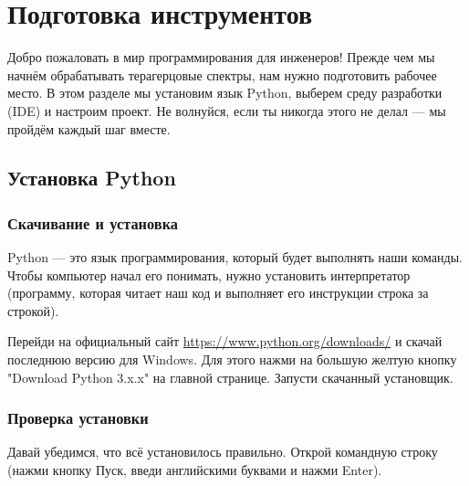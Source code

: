 
\section{Подготовка инструментов}\label{sec:preparation}

Добро пожаловать в мир программирования для инженеров! Прежде чем мы начнём обрабатывать терагерцовые спектры, нам нужно подготовить рабочее место. В этом разделе мы установим язык Python, выберем среду разработки (IDE) и настроим проект. Не волнуйся, если ты никогда этого не делал — мы пройдём каждый шаг вместе.

\subsection{Установка Python}
\subsubsection{Скачивание и установка}

Python — это язык программирования, который будет выполнять наши команды. Чтобы компьютер начал его понимать, нужно установить интерпретатор (программу, которая читает наш код и выполняет его инструкции строка за строкой).

Перейди на официальный сайт \url{https://www.python.org/downloads/} и скачай последнюю версию для Windows. Для этого нажми на большую желтую кнопку "Download Python 3.x.x" на главной странице. Запусти скачанный установщик.



\subsubsection{Проверка установки}

Давай убедимся, что всё установилось правильно. Открой командную строку (нажми кнопку Пуск, введи английскими буквами  и нажми Enter).

